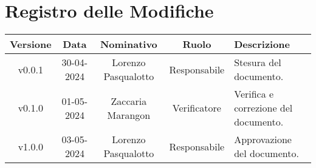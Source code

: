 \section*{\Large Registro delle Modifiche}
    \begin{table}[h]
        \centering
        \renewcommand\tabularxcolumn[1]{m{#1}} %
        \renewcommand{\arraystretch}{1.5}
        \begin{tabularx}{0.98\textwidth}
            {c|c|c|c|>{\centering\arraybackslash}X}
            \rowcolor{black}
            \textbf{\color{white} Versione} & \textbf{\color{white} Data} & \textbf{\color{white} Nominativo} & \textbf{\color{white} Ruolo} & \textbf{\color{white} Descrizione} \\ 
            \hline

            v0.0.1 & 30-04-2024 & Lorenzo Pasqualotto & Responsabile & Stesura del documento.\\
            v0.1.0 & 01-05-2024 & Zaccaria Marangon & Verificatore & Verifica e correzione del documento.\\
            v1.0.0 & 03-05-2024 & Lorenzo Pasqualotto & Responsabile & Approvazione del documento.\\
           
            \hline
        \end{tabularx}
    \end{table}